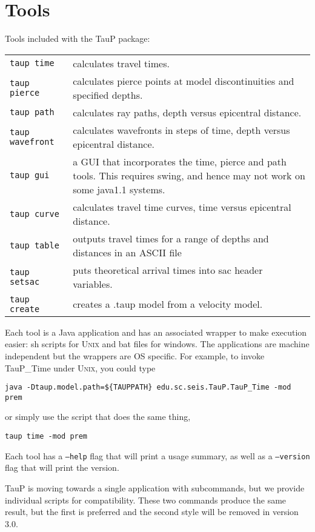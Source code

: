 
\section{Tools}

Tools included with the TauP package:

\begin{center}
\begin{tabular}{lp{3.2in}}

\texttt{taup time} &
  calculates travel times. \\
\texttt{taup pierce} &
  calculates pierce points at model discontinuities and specified depths. \\
\texttt{taup path} & calculates ray paths, depth versus epicentral distance. \\
\texttt{taup wavefront} & calculates wavefronts in steps of time, depth versus epicentral distance. \\
\texttt{taup gui} & a GUI that incorporates the time, pierce and path tools. This
requires swing, and hence may not work on some java1.1 systems. \\
\texttt{taup curve} &
  calculates travel time curves, time versus epicentral distance. \\
\texttt{taup table} & outputs travel times for a range of depths and distances in an ASCII file \\
\texttt{taup setsac} &
  puts theoretical arrival times into sac header variables. \\
\texttt{taup create} &
  creates a .taup model from a velocity model. \\
\end{tabular}
\end{center}

Each tool is a Java application and has an associated wrapper to make
execution easier: sh scripts
for \textsc{Unix} and
bat files for windows.  The applications are machine independent but the
wrappers are OS specific.
For example, to invoke TauP\_Time under \textsc{Unix}, you could type

\texttt{java -Dtaup.model.path=\$\{TAUPPATH\} edu.sc.seis.TauP.TauP\_Time -mod prem}

or simply use the script that does the same thing,

\texttt{taup time -mod prem}

Each tool has a \texttt{--help} flag that will print a usage summary, as well
as a \texttt{--version} flag that will print the version.

TauP is moving towards a single application with subcommands,
but we provide individual scripts for compatibility. These
two commands produce the same result, but the first is
preferred and the second style will be removed in version 3.0.

